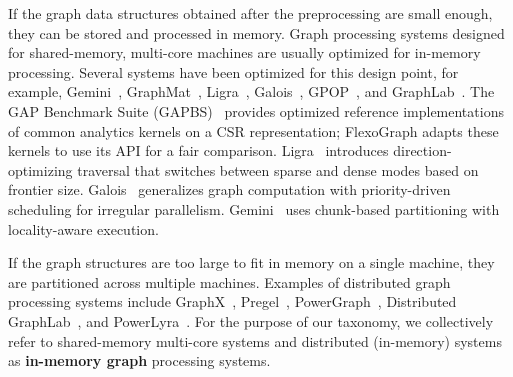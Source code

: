 If the graph data structures obtained after the preprocessing are small enough, they can be stored and processed in memory.
Graph processing systems designed for shared-memory, multi-core machines are usually optimized for in-memory processing.
Several systems have been optimized for this design point, for example, Gemini~\cite{zhu2016gemini}, GraphMat~\cite{graphmat}, Ligra~\cite{shun2013ligra}, Galois~\cite{pingali2011tao}, GPOP~\cite{lakhotia2020gpop}, and GraphLab~\cite{low2012distributed}.
The GAP Benchmark Suite (GAPBS)~\cite{beamer2015gap} provides optimized reference implementations of common analytics kernels on a CSR representation; FlexoGraph adapts these kernels to use its API for a fair comparison.
Ligra~\cite{shun2013ligra} introduces direction-optimizing traversal that switches between sparse and dense modes based on frontier size.
Galois~\cite{nguyen2013lightweight} generalizes graph computation with priority-driven scheduling for irregular parallelism.
Gemini~\cite{zhu2016gemini} uses chunk-based partitioning with locality-aware execution.

If the graph structures are too large to fit in memory on a single machine, they are partitioned across multiple machines.
Examples of distributed graph processing systems include GraphX~\cite{gonzalez2014graphx}, Pregel~\cite{malewicz2010pregel}, PowerGraph~\cite{gonzalez2012powergraph}, Distributed GraphLab~\cite{low2012distributed}, and PowerLyra~\cite{powerlyra2019}.
For the purpose of our taxonomy, we collectively refer to shared-memory multi-core systems and distributed (in-memory) systems as \textbf{in-memory graph} processing systems.

